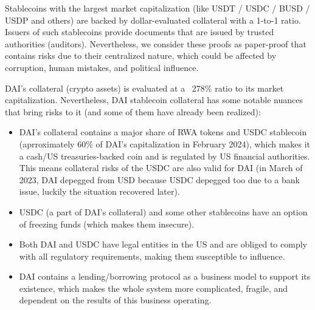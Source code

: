 \nopagebreak

\addtocounter{footnote}{1}
\addtocounter{footnote}{1}
\addtocounter{footnote}{1}
\addtocounter{footnote}{1}
\addtocounter{footnote}{1}


Stablecoins with the largest market capitalization (like USDT / USDC / BUSD / USDP and others) are 
backed by dollar-evaluated collateral with a 1-to-1 ratio. Issuers of such stablecoins 
provide documents that are issued by trusted authorities (auditors). Nevertheless, we consider 
these proofs as paper-proof that contains risks due to their centralized nature, which could 
be affected by corruption, human mistakes, and political influence.

DAI's collateral (crypto assets) is evaluated at a ~278\% ratio to its market capitalization. 
Nevertheless, DAI stablecoin collateral has some notable nuances that bring risks to it (and 
some of them have already been realized):
\begin{itemize}
  \item DAI's collateral contains a major share of RWA tokens and USDC stablecoin (aprroximately 60\% of DAI's capitalization in February 2024), which makes it a cash/US treasuries-backed coin and is regulated by US financial authorities. This means collateral risks of the USDC are also valid for DAI (in March of 2023, DAI depegged from USD because USDC depegged too due to a bank issue, luckily the situation recovered later).
  \item USDC (a part of DAI's collateral) and some other stablecoins have an option of freezing funds (which makes them insecure).
  \item Both DAI and USDC have legal entities in the US and are obliged to comply with all regulatory requirements, making them susceptible to influence.
  \item DAI contains a lending/borrowing protocol as a business model to support its existence, which makes the whole system more complicated, fragile, and dependent on the results of this business operating.
\end{itemize}

